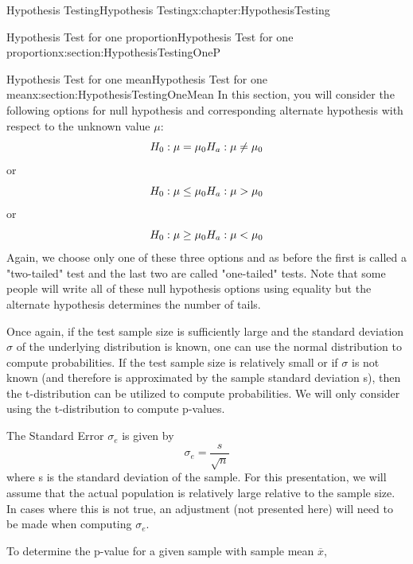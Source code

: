 \documentclass[oneside,10pt,]{book}
\numberwithin{equation}{section}
\newcommand{\lt}{<}
\newcommand{\gt}{>}
\begin{document}
\begin{chapterptx}{Hypothesis Testing}{}{Hypothesis Testing}{}{}{x:chapter:HypothesisTesting}
\begin{sectionptx}{Hypothesis Test for one proportion}{}{Hypothesis Test for one proportion}{}{}{x:section:HypothesisTestingOneP}
\end{sectionptx}
%
%
\typeout{************************************************}
\typeout{************************************************}
%
\begin{sectionptx}{Hypothesis Test for one mean}{}{Hypothesis Test for one mean}{}{}{x:section:HypothesisTestingOneMean}
In this section, you will consider the following options for null hypothesis and corresponding alternate hypothesis with respect to the unknown value \(\mu\):%
\begin{equation*}
H_0 : \mu = \mu_0 \\ H_a: \mu \neq \mu_0
\end{equation*}
or%
\begin{equation*}
H_0 : \mu \le \mu_0 \\ H_a: \mu \gt \mu_0
\end{equation*}
or%
\begin{equation*}
H_0 : \mu \ge \mu_0 \\ H_a:\mu \lt \mu_0
\end{equation*}
Again, we choose only one of these three options and as before the first is called a "two-tailed" test and the last two are called "one-tailed" tests.  Note that some people will write all of these null hypothesis options using equality but the alternate hypothesis determines the number of tails.%
\par
Once again, if the test sample size is sufficiently large and the standard deviation \(\sigma\) of the underlying distribution is known, one can use the normal distribution to compute probabilities. If the test sample size is relatively small or if \(\sigma\) is not known (and therefore is approximated by the sample standard deviation s), then the t-distribution can be utilized to compute probabilities. We will only consider using the t-distribution to compute p-values.%
\par
The Standard Error \(\sigma_e\) is given by%
\begin{equation*}
\sigma_e = \frac{s}{\sqrt{n}}
\end{equation*}
where s is the standard deviation of the sample. For this presentation, we will assume that the actual population is relatively large relative to the sample size. In cases where this is not true, an adjustment (not presented here) will need to be made when computing \(\sigma_e\).%
\par
To determine the p-value for a given sample with sample mean \(\overline{x}\),%

\end{sectionptx}
\end{chapterptx}
\end{document}
